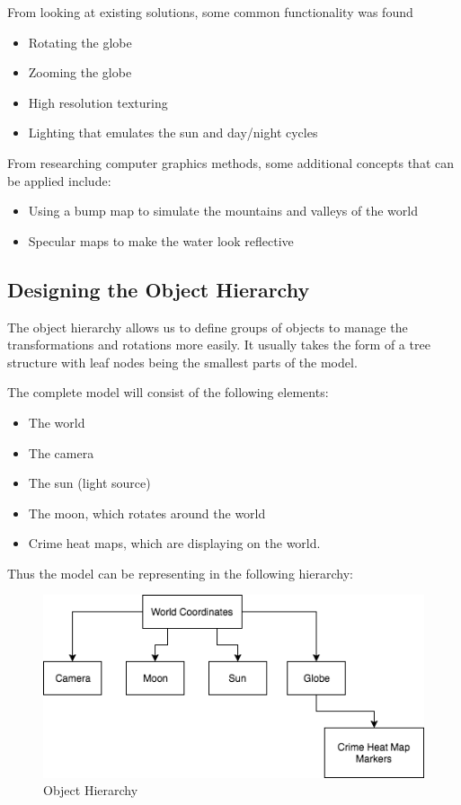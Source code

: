 \documentclass[]{article}
\begin{document}
From looking at existing solutions, some common functionality was found

\begin{itemize}
	\item Rotating the globe
	\item Zooming the globe
	\item High resolution texturing
	\item Lighting that emulates the sun and day/night cycles
\end{itemize}

From researching computer graphics methods, some additional concepts that can be applied include:

\begin{itemize}
	\item Using a bump map to simulate the mountains and valleys of the world
	\item Specular maps to make the water look reflective
\end{itemize}

\subsection{Designing the Object Hierarchy}

The object hierarchy allows us to define groups of objects to manage the transformations and rotations more easily.
It usually takes the form of a tree structure with leaf nodes being the smallest parts of the model.

The complete model will consist of the following elements:

\begin{itemize}
	\item The world
	\item The camera
	\item The sun (light source)
	\item The moon, which rotates around the world
	\item Crime heat maps, which are displaying on the world.
\end{itemize}

Thus the model can be representing in the following hierarchy:

\begin{figure}[H]
   \centering
   \includegraphics[width=0.5\linewidth]{images/object_hierachy}
   \caption{Object Hierarchy}
   \label{fig:object_hierarchy}
\end{figure}
\end{document}
